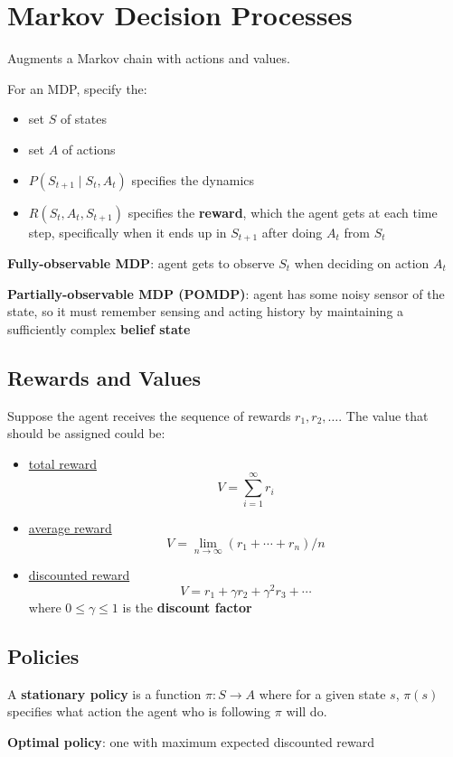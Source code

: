 \documentclass[11pt]{article}
\begin{document}
\section{Markov Decision Processes}
\label{sec:orgef40582}
Augments a Markov chain with actions and values.

For an MDP, specify the:
\begin{itemize}
\item set \(S\) of states
\item set \(A\) of actions
\item \(P(S_{t+1} \mid S_{t}, A_{t})\) specifies the dynamics
\item \(R(S_{t}, A_{t}, S_{t+1})\) specifies the \textbf{reward}, which the agent gets at
each time step, specifically when it ends up in \(S_{t+1}\) after doing \(A_{t}\)
from \(S_{t}\)
\end{itemize}

\textbf{Fully-observable MDP}: agent gets to observe \(S_{t}\) when deciding on action \(A_{t}\)

\textbf{Partially-observable MDP (POMDP)}: agent has some noisy sensor of the state, so it
must remember sensing and acting history by maintaining a sufficiently complex
\textbf{belief state}
\subsection{Rewards and Values}
\label{sec:org67e17eb}
Suppose the agent receives the sequence of rewards \(r_{1}, r_{2}, \dots\).
The value that should be assigned could be:
\begin{itemize}
\item \uline{total reward}
$$ V = \sum_{i=1}^{\infty} r_{i} $$
\item \uline{average reward}
$$V = \lim_{n \to \infty} (r_{1} + \cdots + r_{n}) / n$$
\item \uline{discounted reward}
$$V = r_{1} + \gamma r_{2} + \gamma^{2} r_{3} + \cdots$$
where \(0 \le \gamma \le 1\) is the \textbf{discount factor}
\end{itemize}
\subsection{Policies}
\label{sec:orgcbf248d}
A \textbf{stationary policy} is a function \(\pi : S \to A\) where for a given state \(s\),
\(\pi(s)\) specifies what action the agent who is following \(\pi\) will do.

\textbf{Optimal policy}: one with maximum expected discounted reward
\end{document}
